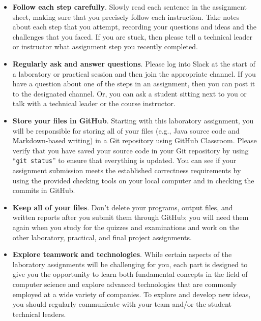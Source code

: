 \documentclass[11pt]{article}
\newcommand{\command}[1]{``\lstinline{#1}''}
\begin{document}
\begin{itemize}
  \setlength{\itemsep}{0pt}

\item {\bf Follow each step carefully}. Slowly read each sentence in the
  assignment sheet, making sure that you precisely follow each instruction. Take
  notes about each step that you attempt, recording your questions and ideas and
  the challenges that you faced. If you are stuck, then please tell a technical
  leader or instructor what assignment step you recently completed.

\item {\bf Regularly ask and answer questions}. Please log into Slack at the
  start of a laboratory or practical session and then join the appropriate
  channel. If you have a question about one of the steps in an assignment, then
  you can post it to the designated channel. Or, you can ask a student sitting
  next to you or talk with a technical leader or the course instructor.

\item {\bf Store your files in GitHub}. Starting with this laboratory
  assignment, you will be responsible for storing all of your files (e.g., Java
  source code and Markdown-based writing) in a Git repository using GitHub
  Classroom. Please verify that you have saved your source code in your Git
  repository by using \command{git status} to ensure that everything is updated.
  You can see if your assignment submission meets the established correctness
  requirements by using the provided checking tools on your local computer and
  in checking the commits in GitHub.

\item {\bf Keep all of your files}. Don't delete your programs, output files,
  and written reports after you submit them through GitHub; you will need them
  again when you study for the quizzes and examinations and work on the other
  laboratory, practical, and final project assignments.

\item {\bf Explore teamwork and technologies}. While certain aspects of the
  laboratory assignments will be challenging for you, each part is designed to
  give you the opportunity to learn both fundamental concepts in the field of
  computer science and explore advanced technologies that are commonly employed
  at a wide variety of companies. To explore and develop new ideas, you should
  regularly communicate with your team and/or the student technical leaders.


\end{itemize}
\end{document}
